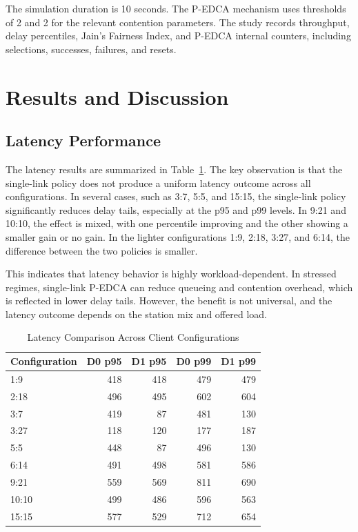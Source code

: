 \documentclass[conference]{IEEEtran}
\begin{document}
The simulation duration is 10 seconds. The P-EDCA mechanism uses thresholds of 2 and 2 for the relevant contention parameters. The study records throughput, delay percentiles, Jain's Fairness Index, and P-EDCA internal counters, including selections, successes, failures, and resets.

\section{Results and Discussion}

\subsection{Latency Performance}
The latency results are summarized in Table~\ref{tab:latency}. The key observation is that the single-link policy does not produce a uniform latency outcome across all configurations. In several cases, such as 3:7, 5:5, and 15:15, the single-link policy significantly reduces delay tails, especially at the p95 and p99 levels. In 9:21 and 10:10, the effect is mixed, with one percentile improving and the other showing a smaller gain or no gain. In the lighter configurations 1:9, 2:18, 3:27, and 6:14, the difference between the two policies is smaller.

This indicates that latency behavior is highly workload-dependent. In stressed regimes, single-link P-EDCA can reduce queueing and contention overhead, which is reflected in lower delay tails. However, the benefit is not universal, and the latency outcome depends on the station mix and offered load.

\begin{table}[t]
\caption{Latency Comparison Across Client Configurations}
\label{tab:latency}
\centering
\small
\begin{tabular}{lrrrr}
\toprule
Configuration & D0 p95 & D1 p95 & D0 p99 & D1 p99 \\
\midrule
1:9   & 418 & 418 & 479 & 479 \\
2:18  & 496 & 495 & 602 & 604 \\
3:7   & 419 & 87  & 481 & 130 \\
3:27  & 118 & 120 & 177 & 187 \\
5:5   & 448 & 87  & 496 & 130 \\
6:14  & 491 & 498 & 581 & 586 \\
9:21  & 559 & 569 & 811 & 690 \\
10:10 & 499 & 486 & 596 & 563 \\
15:15 & 577 & 529 & 712 & 654 \\
\bottomrule
\end{tabular}
\end{table}
\end{document}
